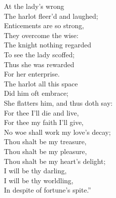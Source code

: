 \begin{dcverse}
\begin{patverse}
At the lady’s wrong\\
The harlot fleer’d and laughed;\\
Enticements are so strong,\\
They overcome the wise:\\
The knight nothing regarded\\
To see the lady scoffed;\\
Thus she was rewarded\\
For her enterprise.\\
The harlot all this space\\
Did him oft embrace;\\
She flatters him, and thus doth say:\\
For thee I’ll die and live,\\
For thee my faith I’ll give,\\
No woe shall work my love’s decay;\\
Thou shalt be my treasure,\\
Thou shalt be my pleasure,\\
Thou shalt be my heart’s delight;\\
I will be thy darling,\\
I will be thy worldling,\\
In despite of fortune’s spite.”
\end{patverse}
\end{dcverse}

\pagebreak

